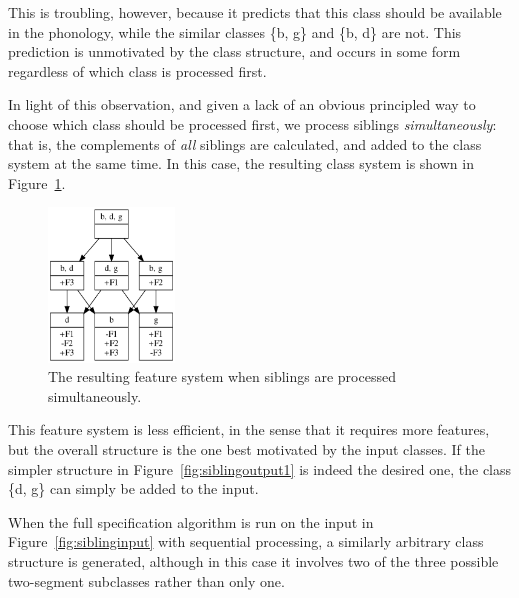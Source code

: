 \documentclass[11pt, oneside]{article}   	%
\begin{document}
This is troubling, however, because it predicts that this class should be available in the phonology, while the similar classes \{b, g\} and \{b, d\} are not. This prediction is unmotivated by the class structure, and occurs in some form regardless of which class is processed first.

In light of this observation, and given a lack of an obvious principled way to choose which class should be processed first, we process siblings \textit{simultaneously}: that is, the complements of \textit{all} siblings are calculated, and added to the class system at the same time. In this case, the resulting class system is shown in Figure~\ref{fig:siblingoutput2}.

\begin{figure}[htb!]
	\centering
	\includegraphics[width=0.3\textwidth]{sibling_output2.png}
	\caption{The resulting feature system when siblings are processed simultaneously.}
	\label{fig:siblingoutput2}
\end{figure}

This feature system is less efficient, in the sense that it requires more features, but the overall structure is the one best motivated by the input classes. If the simpler structure in Figure~\ref{fig:siblingoutput1} is indeed the desired one, the class \{d, g\} can simply be added to the input.

When the full specification algorithm is run on the input in Figure~\ref{fig:siblinginput} with sequential processing, a similarly arbitrary class structure is generated, although in this case it involves two of the three possible two-segment subclasses rather than only one.



\end{document}
